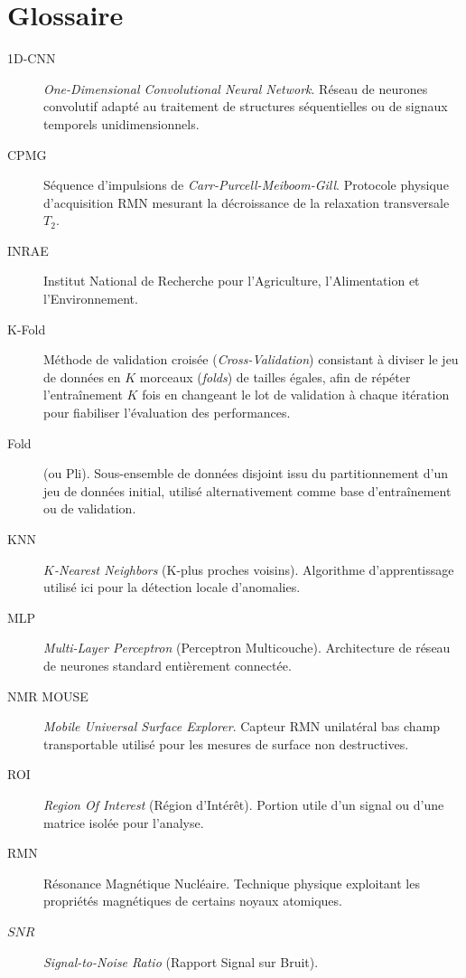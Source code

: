 \documentclass[12pt,a4paper,twoside]{article}
\begin{document}
\clearpage

\thispagestyle{plain}
\section*{Glossaire}
\begin{description}
    \item[1D-CNN] \textit{One-Dimensional Convolutional Neural Network}. Réseau de neurones convolutif adapté au traitement de structures séquentielles ou de signaux temporels unidimensionnels.
    \item[CPMG] Séquence d'impulsions de \textit{Carr-Purcell-Meiboom-Gill}. Protocole physique d'acquisition RMN mesurant la décroissance de la relaxation transversale $T_2$.
    \item[INRAE] Institut National de Recherche pour l'Agriculture, l'Alimentation et l'Environnement.
    \item[K-Fold] Méthode de validation croisée (\textit{Cross-Validation}) consistant à diviser le jeu de données en $K$ morceaux (\textit{folds}) de tailles égales, afin de répéter l'entraînement $K$ fois en changeant le lot de validation à chaque itération pour fiabiliser l'évaluation des performances.
    \item[Fold] (ou Pli). Sous-ensemble de données disjoint issu du partitionnement d'un jeu de données initial, utilisé alternativement comme base d'entraînement ou de validation.
    \item[KNN] \textit{$K$-Nearest Neighbors} (K-plus proches voisins). Algorithme d'apprentissage utilisé ici pour la détection locale d'anomalies.
    \item[MLP] \textit{Multi-Layer Perceptron} (Perceptron Multicouche). Architecture de réseau de neurones standard entièrement connectée.
    \item[NMR MOUSE] \textit{Mobile Universal Surface Explorer}. Capteur RMN unilatéral bas champ transportable utilisé pour les mesures de surface non destructives.
    \item[ROI] \textit{Region Of Interest} (Région d'Intérêt). Portion utile d'un signal ou d'une matrice isolée pour l'analyse.
    \item[RMN] Résonance Magnétique Nucléaire. Technique physique exploitant les propriétés magnétiques de certains noyaux atomiques.
    \item[$SNR$] \textit{Signal-to-Noise Ratio} (Rapport Signal sur Bruit).
\end{description}
\end{document}
